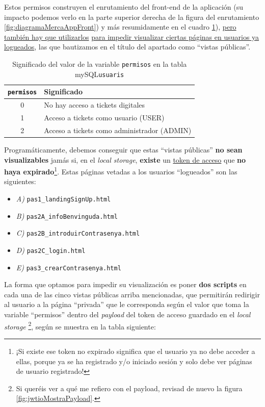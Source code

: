 \documentclass[a4paper,12pt]{report}
\begin{document}
	Estos permisos construyen el enrutamiento del front-end de la aplicación (su impacto podemos verlo en la parte superior derecha de la figura del enrutamiento \ref{fig:diagramaMercaAppFront}) y más resumidamente en el cuadro \ref{table:permisos}), \underline{pero también hay que utilizarlos} \underline{para impedir visualizar ciertas páginas en usuarios ya logueados}, las que bautizamos en el título del apartado como ``vistas públicas''.
	
	\begin{table}[H]
		\centering
		\caption{Significado del valor de la variable \texttt{permisos} en la tabla mySQL\texttt{usuaris}}
		\begin{tabular}{|c|l|}
			\hline
			\textbf{\texttt{permisos}} & \textbf{Significado} \\
			\hline
			0 & No hay acceso a tickets digitales \\
			1 & Acceso a tickets como usuario (USER) \\
			2 & Acceso a tickets como administrador (ADMIN) \\
			\hline
		\end{tabular}
		\label{table:permisos}
		
	\end{table}
	
	Programáticamente, debemos conseguir que estas ``vistas públicas'' \textbf{no sean visualizables} jamás si, en el \textit{local storage}, \textbf{existe}  un \underline{token de acceso} que \textbf{no haya expirado}\footnote{¡Si existe ese token no expirado significa que el usuario ya no debe acceder a ellas, porque ya se ha registrado y/o iniciado sesión y solo debe ver páginas de usuario registrado!}. Estas páginas vetadas a los usuarios ``logueados'' son las siguientes:
	
	\vspace{0em}
	\begin{itemize}
		\setlength{\itemsep}{-.5em}
		\item \textit{A)} \texttt{pas1\_landingSignUp.html}
		\item \textit{B)} \texttt{pas2A\_infoBenvinguda.html}
		\item \textit{C)} \texttt{pas2B\_introduirContrasenya.html}
		\item \textit{D)} \texttt{pas2C\_login.html}
		\item \textit{E)} \texttt{pas3\_crearContrasenya.html}
	\end{itemize}
	
	La forma que optamos para impedir su visualización es poner \textbf{dos scripts} en cada una de las cinco vistas públicas arriba mencionadas, que permitirán redirigir al usuario a la página ``privada'' que le corresponda según el valor que toma la variable ``permisos'' dentro del \textit{payload} del token de acceso guardado en el \textit{local storage} \footnote{Si queréis ver a qué me refiero con el payload, revisad de nuevo la figura \ref{fig:jwtioMostraPayload}.}, según se muestra en la tabla siguiente:
		
\end{document}
